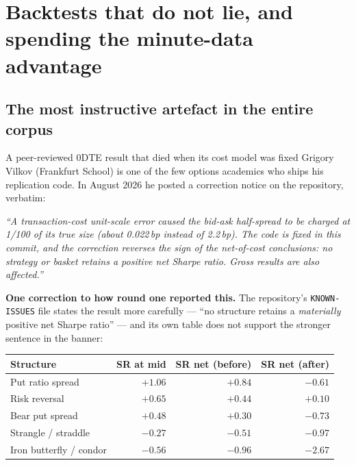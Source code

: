\documentclass[11pt,a4paper]{article}
\begin{document}
\newpage
\section{Backtests that do not lie, and spending the minute-data advantage}
\label{sec:backtest}

\subsection{The most instructive artefact in the entire corpus}
\label{sec:vilkov}

\begin{keyfact}{A peer-reviewed 0DTE result that died when its cost model was fixed}
Grigory Vilkov (Frankfurt School) is one of the few options academics who ships
his replication code. In August 2026 he posted a correction notice on the
repository, verbatim:

\smallskip
\emph{``A transaction-cost unit-scale error caused the bid-ask half-spread to be
charged at 1/100 of its true size (about 0.022\,bp instead of 2.2\,bp). The code
is fixed in this commit, and the correction reverses the sign of the
net-of-cost conclusions: no strategy or basket retains a positive net Sharpe
ratio. Gross results are also affected.''}
\end{keyfact}

\textbf{One correction to how round one reported this.} The repository's
\texttt{KNOWN-ISSUES} file states the result more carefully --- ``no structure
retains a \emph{materially} positive net Sharpe ratio'' --- and its own table does
not support the stronger sentence in the banner:

\begin{center}
\begin{tabular}{@{}lrrr@{}}
\toprule
Structure & SR at mid & SR net (before) & SR net (after) \\
\midrule
Put ratio spread     & $+1.06$ & $+0.84$ & $\mathbf{-0.61}$ \\
Risk reversal        & $+0.65$ & $+0.44$ & $\mathbf{+0.10}$ \\
Bear put spread      & $+0.48$ & $+0.30$ & $\mathbf{-0.73}$ \\
Strangle / straddle  & $-0.27$ & $-0.51$ & $-0.97$ \\
Iron butterfly / condor & $-0.56$ & $-0.96$ & $-2.67$ \\
\bottomrule
\end{tabular}
\end{center}
\end{document}
